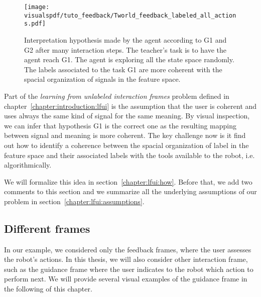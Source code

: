 
\begin{figure}[!htbp]
    \centering
    \texttt{[image: \\visualspdf/tuto\_feedback/Tworld\_feedback\_labeled\_all\_actions.pdf]}
    \caption{Interpretation hypothesis made by the agent according to G1 and G2 after many interaction steps. The teacher's task is to have the agent reach G1. The agent is exploring all the state space randomly. The labels associated to the task G1 are more coherent with the spacial organization of signals in the feature space.}
    \label{fig:TworldLabelinterpretation}
\end{figure}

Part of the \emph{learning from unlabeled interaction frames} problem defined in chapter~\ref{chapter:introduction:lfui} is the assumption that the user is coherent and uses always the same kind of signal for the same meaning. By visual inspection, we can infer that hypothesis G1 is the correct one as the resulting mapping between signal and meaning is more coherent. The key challenge now is it find out how to identify a coherence between the spacial organization of label in the feature space and their associated labels with the tools available to the robot, i.e. algorithmically. 

We will formalize this idea in section~\ref{chapter:lfui:how}. Before that, we add two comments to this section and we summarize all the underlying assumptions of our problem in section~\ref{chapter:lfui:assumptions}.

\subsection{Different frames}

In our example, we considered only the feedback frames, where the user assesses the robot's actions. In this thesis, we will also consider other interaction frame, such as the guidance frame where the user indicates to the robot which action to perform next. We will provide several visual examples of the guidance frame in the following of this chapter.

